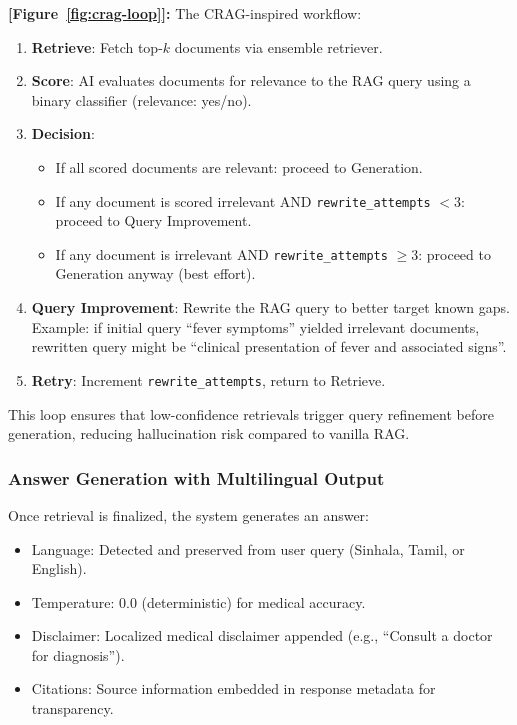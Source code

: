 \documentclass[11pt,a4paper]{article}
\begin{document}
\textbf{[Figure~\ref{fig:crag-loop}]:} The CRAG-inspired workflow:

\begin{enumerate}
    \item \textbf{Retrieve}: Fetch top-$k$ documents via ensemble retriever.
    \item \textbf{Score}: AI evaluates documents for relevance to the RAG query using a binary classifier (relevance: yes/no).
    \item \textbf{Decision}:
    \begin{itemize}
        \item If all scored documents are relevant: proceed to Generation.
        \item If any document is scored irrelevant AND \texttt{rewrite\_attempts} $< 3$: proceed to Query Improvement.
        \item If any document is irrelevant AND \texttt{rewrite\_attempts} $\geq 3$: proceed to Generation anyway (best effort).
    \end{itemize}
    \item \textbf{Query Improvement}: Rewrite the RAG query to better target known gaps. Example: if initial query ``fever symptoms'' yielded irrelevant documents, rewritten query might be ``clinical presentation of fever and associated signs''.
    \item \textbf{Retry}: Increment \texttt{rewrite\_attempts}, return to Retrieve.
\end{enumerate}

This loop ensures that low-confidence retrievals trigger query refinement before generation, reducing hallucination risk compared to vanilla RAG.

\subsubsection{Answer Generation with Multilingual Output}
Once retrieval is finalized, the system generates an answer:

\begin{itemize}
    \item Language: Detected and preserved from user query (Sinhala, Tamil, or English).
    \item Temperature: 0.0 (deterministic) for medical accuracy.
    \item Disclaimer: Localized medical disclaimer appended (e.g., ``Consult a doctor for diagnosis'').
    \item Citations: Source information embedded in response metadata for transparency.
\end{itemize}
\end{document}
